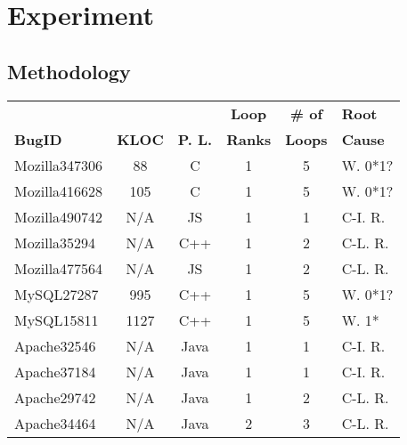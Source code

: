 \section{Experiment}
\label{sec:6_experiment}

\subsection{Methodology}


\begin{table}
  \centering
  \small
  \newcommand{\Yes}[1]{\checkmark{}$_#1$}
  \newcommand{\No}[0]{-}
  \begin{tabular}{lccccl}
    \toprule
                    &      	   &                        &{\bf Loop }  &  {\bf  \# of}   & {\bf Root}  \\
   {\bf BugID}      &  {\bf KLOC}  &  {\bf P. L.}           &{\bf Ranks}  &  {\bf  Loops}   & {\bf Cause} \\
   \midrule
   Mozilla347306    & 88           & C                      & 1               & 5               &  W. 0*1?     \\
   Mozilla416628    & 105          & C                      & 1               & 5               &  W. 0*1?     \\
   Mozilla490742    & N/A          & JS                     & 1               & 1               &  C-I. R.       \\
   Mozilla35294     & N/A          & C++                    & 1               & 2               &  C-L. R.        \\ 
   Mozilla477564    & N/A          & JS                     & 1               & 2               &  C-L. R.       \\
   \midrule 
   MySQL27287       & 995          & C++                    & 1               & 5               &  W. 0*1?     \\
   MySQL15811       & 1127         & C++                    & 1               & 5               &  W. 1* \\ 
   \midrule    
   Apache32546      & N/A          & Java                   & 1               & 1               &  C-I. R.  \\
   Apache37184      & N/A          & Java                   & 1               & 1               &  C-I. R.  \\
   Apache29742      & N/A          & Java                   & 1               & 2               &  C-L. R. \\ 
   Apache34464      & N/A          & Java                   & 2               & 3               &  C-L. R.  \\

\end{tabular}
\end{table}
